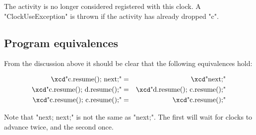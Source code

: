 \noindent{} The activity is no longer considered registered with this
clock.  A \xcd"ClockUseException" is thrown if the activity has
already dropped \xcd"c".


%

\subsection{Program equivalences}
From the discussion above it should be clear that the following
equivalences hold:

\begin{eqnarray}
 \mbox{\xcd"c.resume(); next;"}       &=& \mbox{\xcd"next;"}\\
 \mbox{\xcd"c.resume(); d.resume();"} &=& \mbox{\xcd"d.resume(); c.resume();"}\\
 \mbox{\xcd"c.resume(); c.resume();"} &=& \mbox{\xcd"c.resume();"}
\end{eqnarray}

Note that \xcd"next; next;" is not the same as \xcd"next;". The
first will wait for clocks to advance twice, and the second
once.  



